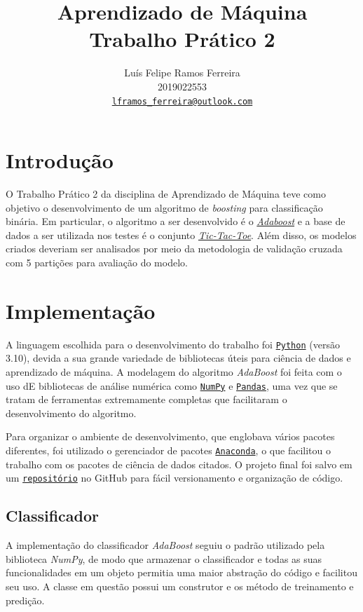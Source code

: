 \documentclass{article}
\title{Aprendizado de Máquina \\ Trabalho Prático 2}
\author{Luís Felipe Ramos Ferreira \\ 2019022553 \\
    \href{mailto:lframos_ferreira@outlook.com}{\texttt{lframos\_ferreira@outlook.com}}}
\begin{document}
\maketitle

\section{Introdução}

O Trabalho Prático 2 da disciplina de Aprendizado de Máquina teve como objetivo
o desenvolvimento de um algoritmo de \textit{boosting}
para classificação binária. Em particular, o algoritmo a ser desenvolvido é o
\href{https://en.wikipedia.org/wiki/AdaBoost}{\textit{Adaboost}} e a base de
dados a ser
utilizada nos testes é o conjunto
\href{https://archive.ics.uci.edu/ml/datasets/Tic-Tac-Toe+Endgame}{\textit{Tic-Tac-Toe}}.
Além disso, os modelos criados deveriam
ser analisados por meio da metodologia de validação cruzada com 5 partições
para avaliação do modelo.

\section{Implementação}

A linguagem escolhida para o desenvolvimento do trabalho foi
\href{https://www.python.org/}{\texttt{Python}} (versão 3.10), devida a sua
grande variedade de bibliotecas úteis para ciência de dados e aprendizado de
máquina.
A modelagem do algoritmo \textit{AdaBoost} foi feita com o uso dE bibliotecas
de análise numérica como \href{https://numpy.org/}{\texttt{NumPy}} e
\href{https://pandas.pydata.org/}{\texttt{Pandas}},
uma vez que se tratam de ferramentas extremamente completas que facilitaram o
desenvolvimento do algoritmo.

Para organizar o ambiente de desenvolvimento, que englobava vários pacotes
diferentes, foi utilizado o gerenciador de pacotes
\href{https://www.anaconda.com/}{\texttt{Anaconda}}, o que facilitou o trabalho
com os pacotes de ciência de dados citados. O projeto final foi salvo em um
\href{https://github.com/lframosferreira/boosting-process}{\texttt{repositório}}
no GitHub para fácil versionamento e organização de código.

\subsection{Classificador}

A implementação do classificador \textit{AdaBoost} seguiu o padrão utilizado
pela biblioteca \textit{NumPy}, de modo que armazenar o classificador e todas
as suas funcionalidades em um objeto permitia uma maior abstração do código e
facilitou seu uso. A classe em questão possui um construtor e os método de
treinamento e predição.
\end{document}

